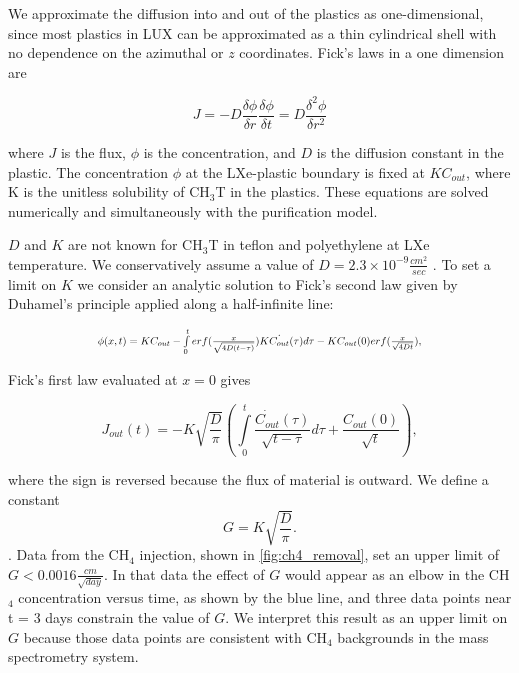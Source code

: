 We approximate the diffusion into and out of the plastics as one-dimensional, since most plastics in LUX can be approximated as a thin cylindrical shell with no dependence on the azimuthal or $z$ coordinates.  Fick's laws in a one dimension are

\begin{equation}
J=-D\frac{\delta \phi}{\delta r}
\frac{\delta \phi}{\delta t} = D \frac{\delta^2 \phi}{\delta r^2} 
\end{equation}

\noindent 
where $J$ is the flux, $\phi$ is the concentration, and $D$ is the diffusion constant in the plastic. The concentration $\phi$ at the LXe-plastic boundary is fixed at $KC_{out}$, where K is the unitless solubility of CH$_3$T in the plastics. These equations are solved numerically and simultaneously with the purification model. 

$D$ and $K$ are not known for CH$_3$T in teflon and polyethylene at LXe temperature. We conservatively assume a value of $D = 2.3 \times 10^{-9} \frac {cm^2}{sec}$ . To set a limit on $K$ we consider an analytic solution to Fick's second law given by Duhamel's principle applied along a half-infinite line:

\begin{equation}
\Scale[0.75]{\phi (x,t) = KC_{out} - \int \limits_0^t erf(\frac{x}{\sqrt{4D(t - \tau)}})K\dot{C_{out}}(\tau)d\tau - KC_{out}(0)erf(\frac{x}{\sqrt{4Dt}}),}
\end{equation}


\noindent
Fick's first law evaluated at $x=0$ gives

\begin{equation}
J_{out}(t)= - K \sqrt{\frac{D}{\pi}}\left( \int \limits_0^t \frac{\dot{C_{out}}(\tau)}{\sqrt{t-\tau}} d \tau + \frac{C_{out}(0)}{\sqrt{t}}\right),
\end{equation}

\noindent
where the sign is reversed because the flux of material is outward. We define a constant
\[ G = K \sqrt{ \frac{D}{ \pi }} .\]. Data from the CH$_4$ injection, shown in \ref{fig:ch4_removal}, set an upper limit of $G<0.0016 \frac{cm}{\sqrt{day}}$. In that data the effect of $G$ would appear as an elbow in the CH$_4$ concentration versus time, as shown by the blue line, and three data points near t = 3 days constrain the value of $G$. We interpret this result as an upper limit on $G$ because those data points are consistent with CH$_4$ backgrounds in the mass spectrometry system.


